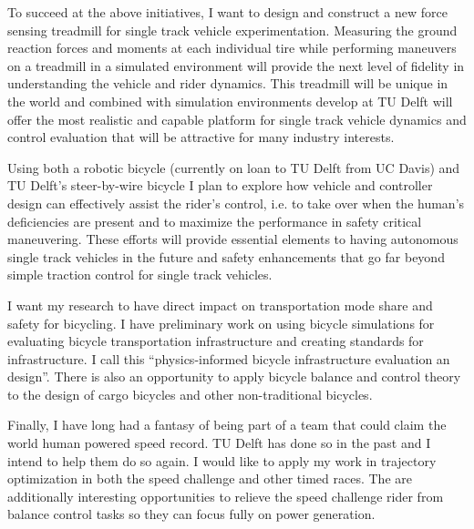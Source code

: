 \documentclass{article}
\begin{document}
To succeed at the above initiatives, I want to design and construct a new force
sensing treadmill for single track vehicle experimentation. Measuring the
ground reaction forces and moments at each individual tire while performing
maneuvers on a treadmill in a simulated environment will provide the next level
of fidelity in understanding the vehicle and rider dynamics. This treadmill
will be unique in the world and combined with simulation environments develop
at TU Delft will offer the most realistic and capable platform for single track
vehicle dynamics and control evaluation that will be attractive for many
industry interests.

Using both a robotic bicycle (currently on loan to TU Delft from UC Davis) and
TU Delft's steer-by-wire bicycle I plan to explore how vehicle and controller
design can effectively assist the rider's control, i.e. to take over when the
human's deficiencies are present and to maximize the performance in safety
critical maneuvering. These efforts will provide essential elements to having
autonomous single track vehicles in the future and safety enhancements that go
far beyond simple traction control for single track vehicles.

I want my research to have direct impact on transportation mode share and
safety for bicycling. I have preliminary work on using bicycle simulations for
evaluating bicycle transportation infrastructure and creating standards for
infrastructure. I call this ``physics-informed bicycle infrastructure
evaluation an design''. There is also an opportunity to apply bicycle balance
and control theory to the design of cargo bicycles and other non-traditional
bicycles.

Finally, I have long had a fantasy of being part of a team that could claim the
world human powered speed record. TU Delft has done so in the past and I intend
to help them do so again. I would like to apply my work in trajectory
optimization in both the speed challenge and other timed races. The are
additionally interesting opportunities to relieve the speed challenge rider
from balance control tasks so they can focus fully on power generation.




\end{document}
